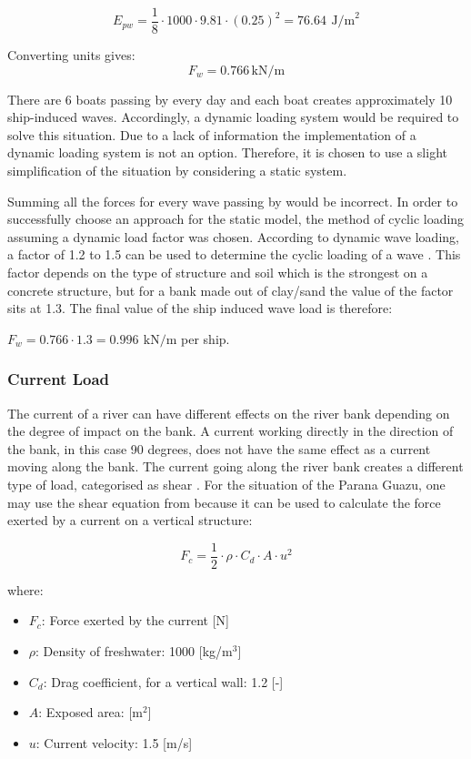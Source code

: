 $$
E_{pw} = \frac{1}{8} \cdot 1000 \cdot 9.81 \cdot (0.25)^2 = 76.64 \, ~\text{J/m}^2
$$

Converting units gives:
$$
{F_w}= 0.766 \, \text{kN/m}
$$

There are 6 boats passing by every day and each boat creates approximately 10 ship-induced waves. Accordingly, a dynamic loading system would be required to solve this situation. Due to a lack of information the implementation of a dynamic loading system is not an option. Therefore, it is chosen to use a slight simplification of the situation by considering a static system. 

Summing all the forces for every wave passing by would be incorrect. In order to successfully choose an approach for the static model, the method of cyclic loading assuming a dynamic load factor was chosen. According to dynamic wave loading, a factor of 1.2 to 1.5 can be used to determine the cyclic loading of a wave \autocite{cuomoDynamicWaveLoads2004}. This factor depends on the type of structure and soil which is the strongest on a concrete structure, but for a bank made out of clay/sand the value of the factor sits at 1.3. The final value of the ship induced wave load is therefore:

$ F_{w} = 0.766 \cdot 1.3 = 0.996  \, ~\text{kN/m}$ per ship. 

\subsubsection{Current Load}
The current of a river can have different effects on the river bank depending on the degree of impact on the bank. A current working directly in the direction of the bank, in this case 90 degrees, does not have the same effect as a current moving along the bank. The current going along the river bank creates a different type of load, categorised as shear \autocite{chowOpenChannelHydraulics}.
For the situation of the Parana Guazu, one may use the shear equation from 
because it can be used to calculate the force exerted by a current on a vertical structure:

\begin{equation}
\label{eq:drag load}
    F_c = \frac{1}{2} \cdot \rho \cdot C_d \cdot A \cdot u^2
\end{equation}


\noindent where:
\begin{itemize}
    \item \textbf{$ F_c $}: Force exerted by the current [N]
    \item \textbf{$ \rho $}: Density of freshwater: 1000 [kg/m$^3$]
    \item \textbf{$ C_d $}: Drag coefficient, for a vertical wall: 1.2 [-]
    \item \textbf{$ A $}: Exposed area:  [m$^2$]
    \item \textbf{$ u $}: Current velocity: 1.5 [m/s]
\end{itemize}

